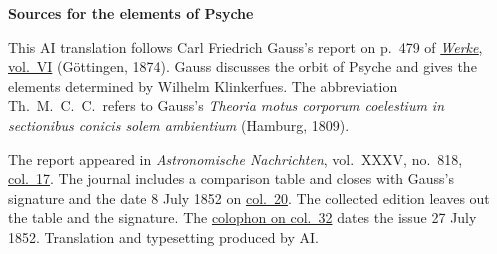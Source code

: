 \clearpage\thispagestyle{empty}
\begin{center}\textbf{Sources for the elements of Psyche}\end{center}
\noindent This AI translation follows Carl Friedrich Gauss’s report on p.~479 of \href{https://gdz.sub.uni-goettingen.de/id/PPN236007467}{\textit{Werke}, vol.~VI} (Göttingen, 1874). Gauss discusses the orbit of Psyche and gives the elements determined by Wilhelm Klinkerfues. The abbreviation Th.\ M.\ C.\ C.\ refers to Gauss’s \textit{Theoria motus corporum coelestium in sectionibus conicis solem ambientium} (Hamburg, 1809).
\par\smallskip\noindent The report appeared in \textit{Astronomische Nachrichten}, vol.~XXXV, no.~818, \href{https://api.digitale-sammlungen.de/iiif/image/v2/bsb10049460_00013/full/1800,/0/default.jpg}{col.~17}. The journal includes a comparison table and closes with Gauss’s signature and the date 8 July 1852 on \href{https://api.digitale-sammlungen.de/iiif/image/v2/bsb10049460_00014/full/1800,/0/default.jpg}{col.~20}. The collected edition leaves out the table and the signature. The \href{https://api.digitale-sammlungen.de/iiif/image/v2/bsb10049460_00020/full/1800,/0/default.jpg}{colophon on col.~32} dates the issue 27 July 1852. Translation and typesetting produced by AI.
\clearpage
